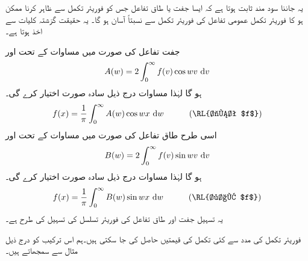یہ جاننا سود مند ثابت ہوتا ہے کہ ایسا جفت یا طاق تفاعل جس کو فوریئر تکمل سے ظاہر کرنا ممکن ہو کا فوریئر تکمل عمومی تفاعل کی فوریئر تکمل سے نسبتاً آسان ہو گا۔ یہ حقیقت گزشتہ کلیات سے اخذ ہوتا ہے۔

جفت تفاعل  کی صورت میں مساوات   کے تحت  اور
\begin{align}\label{مساوات_فوریئر_تکمل_جفت_الف}
A(w)=2\int_0^{\infty} f(v)\cos wv\, \dif v
\end{align}
ہو گا لہٰذا مساوات  درج ذیل سادہ صورت اختیار کرے گی۔
\begin{align}\label{مساوات_فوریئر_تکمل_جفت_ب}
f(x)=\frac{1}{\pi}\int_0^{\infty} A(w)\cos wx\,\dif w\quad \quad \quad (\text{\RL{جفت $f$}})
\end{align}
اسی طرح طاق تفاعل  کی صورت میں مساوات   کے تحت  اور
\begin{align}\label{مساوات_فوریئر_تکمل_جفت_پ}
B(w)=2\int_0^{\infty} f(v)\sin wv\, \dif v
\end{align}
ہو گا لہٰذا مساوات  درج ذیل سادہ صورت اختیار کرے گی۔
\begin{align}\label{مساوات_فوریئر_تکمل_جفت_ت}
f(x)=\frac{1}{\pi}\int_0^{\infty} B(w)\sin wx\,\dif w\quad \quad \quad (\text{\RL{طاق $f$}})
\end{align}
یہ تسہیل جفت اور طاق تفاعل کی  فوریئر تسلسل کی تسہیل کی طرح ہے۔

فوریئر تکمل کی  مدد سے کئی  تکمل کی قیمتیں حاصل کی جا سکتی ہیں۔ہم اس ترکیب کو درج ذیل مثال سے سمجھاتے  ہیں۔

